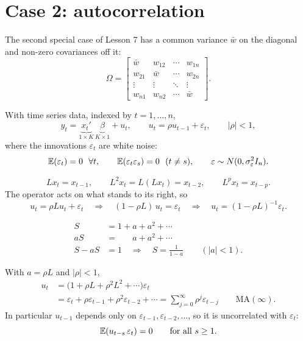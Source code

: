 \documentclass[11pt]{article}
\begin{document}
\section{Case 2: autocorrelation}

The second special case of Lesson 7 has a common variance $\bar w$ on the diagonal and
non-zero covariances off it:
\[ \Omega = \begin{bmatrix}
     \bar w & w_{12} & \cdots & w_{1n}\\
     w_{21} & \bar w & \cdots & w_{2n}\\
     \vdots & \vdots & \ddots & \vdots\\
     w_{n1} & w_{n2} & \cdots & \bar w
   \end{bmatrix}. \]

With time series data, indexed by $t = 1, \dots, n$,
\[ y_{t} = \underbrace{x_{t}'}_{1\times K}\,\underbrace{\beta}_{K\times 1} + u_{t},
   \qquad u_{t} = \rho u_{t-1} + \varepsilon_{t}, \qquad |\rho| < 1, \]
where the innovations $\varepsilon_{t}$ are white noise:
\[ \E(\varepsilon_{t}) = 0 \ \ \forall t, \qquad
   \E(\varepsilon_{t}\varepsilon_{s}) = 0 \ \ (t \neq s), \qquad
   \varepsilon \sim N(0, \sigma_{\varepsilon}^{2}I_{n}). \]

\[ Lx_{t} = x_{t-1}, \qquad L^{2}x_{t} = L(Lx_{t}) = x_{t-2}, \qquad
   L^{p}x_{t} = x_{t-p}. \]
The operator acts on what stands to its right, so
\[ u_{t} = \rho Lu_{t} + \varepsilon_{t}
   \quad\Longrightarrow\quad (1 - \rho L)\,u_{t} = \varepsilon_{t}
   \quad\Longrightarrow\quad u_{t} = (1 - \rho L)^{-1}\varepsilon_{t}. \]

\begin{align*}
  S &= 1 + a + a^{2} + \cdots\\
  aS &= \phantom{1 + {}} a + a^{2} + \cdots\\
  S - aS &= 1 \quad\Longrightarrow\quad S = \frac{1}{1 - a} \qquad (|a| < 1).
\end{align*}

With $a = \rho L$ and $|\rho| < 1$,
\begin{align*}
  u_{t} &= \bigl(1 + \rho L + \rho^{2}L^{2} + \cdots\bigr)\varepsilon_{t}\\
        &= \varepsilon_{t} + \rho\varepsilon_{t-1} + \rho^{2}\varepsilon_{t-2} + \cdots
         = \sum_{j=0}^{\infty}\rho^{j}\varepsilon_{t-j}
         \qquad \text{MA}(\infty).
\end{align*}
In particular $u_{t-1}$ depends only on $\varepsilon_{t-1}, \varepsilon_{t-2}, \dots$,
so it is uncorrelated with $\varepsilon_{t}$:
\[ \mathbb{E}(u_{t-s}\,\varepsilon_{t}) = 0 \qquad \text{for all } s \geq 1. \]
\end{document}
